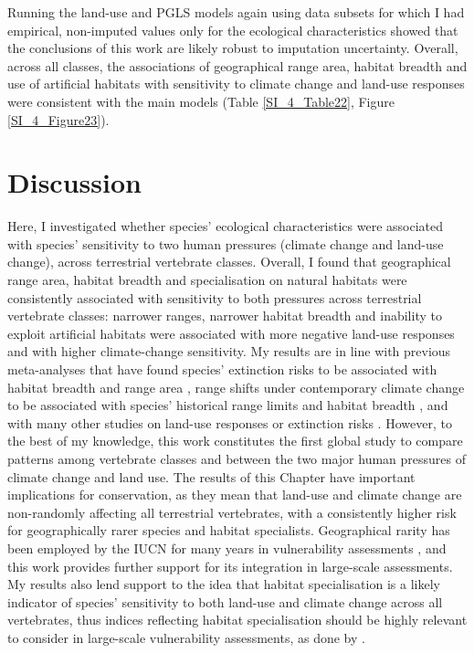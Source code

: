 Running the land-use and PGLS models again using data subsets for which I had empirical, non-imputed values only for the ecological characteristics showed that the conclusions of this work are likely robust to imputation uncertainty. Overall, across all classes, the associations of geographical range area, habitat breadth and use of artificial habitats with sensitivity to climate change and land-use responses were consistent with the main models (Table \ref{SI_4_Table22}, Figure \ref{SI_4_Figure23}).



\section{Discussion}
Here, I investigated whether species' ecological characteristics were associated with species' sensitivity to two human pressures (climate change and land-use change), across terrestrial vertebrate classes. Overall, I found that geographical range area, habitat breadth and specialisation on natural habitats were consistently associated with sensitivity to both pressures across terrestrial vertebrate classes: narrower ranges, narrower habitat breadth and inability to exploit artificial habitats were associated with more negative land-use responses and with higher climate-change sensitivity. My results are in line with previous meta-analyses that have found species' extinction risks to be associated with habitat breadth and range area \citep{Chichorro2019}, range shifts under contemporary climate change to be associated with species' historical range limits and habitat breadth \citep{MacLean2017}, and with many other studies on land-use responses or extinction risks \citep{Ripple2017, Newbold2018a, Nowakowski2017, Purvis2000}. However, to the best of my knowledge, this work constitutes the first global study to compare patterns among vertebrate classes and between the two major human pressures of climate change and land use. The results of this Chapter have important implications for conservation, as they mean that land-use and climate change are non-randomly affecting all terrestrial vertebrates, with a consistently higher risk for geographically rarer species and habitat specialists. Geographical rarity has been employed by the IUCN for many years in vulnerability assessments \citep{Rodrigues2006}, and this work provides further support for its integration in large-scale assessments. My results also lend support to the idea that habitat specialisation is a likely indicator of species' sensitivity to both land-use and climate change across all vertebrates, thus indices reflecting habitat specialisation should be highly relevant to consider in large-scale vulnerability assessments, as done by \citet{Foden2013}. 

